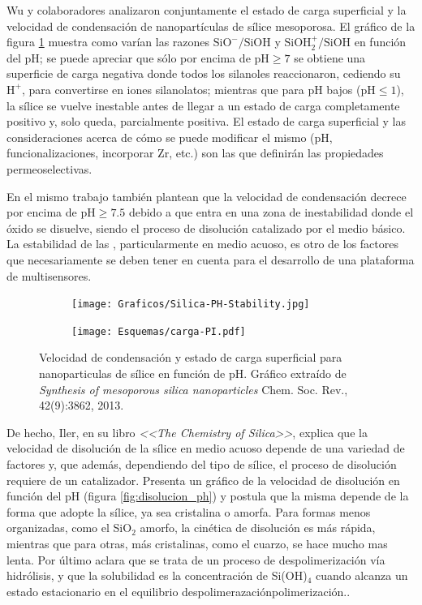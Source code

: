      Wu y colaboradores\cite{Si-HanWu2013} analizaron conjuntamente el estado de carga superficial y la velocidad de condensación de nanopartículas de sílice mesoporosa. El gráfico de la figura \ref{fig:silica_ph} muestra como varían las razones  $\text{SiO}^{-}/\text{SiOH}$ y $\text{SiOH}_2^{+}/\text{SiOH}$ en función del pH; se puede apreciar que sólo por encima de $\text{pH}\geq7$ se obtiene una superficie de carga negativa donde todos los silanoles reaccionaron, cediendo su $\text{H}^{+}$, para convertirse en iones silanolatos; mientras que para pH bajos ($\text{pH}\leq1$), la sílice se vuelve inestable antes de llegar a un estado de carga completamente positivo y, solo queda, parcialmente positiva. El estado de carga superficial y las consideraciones acerca de cómo se puede modificar el mismo (pH, funcionalizaciones, incorporar Zr, etc.) son las que definirán las propiedades permeoselectivas.  
	 
	 En el mismo trabajo\cite{Si-HanWu2013} también plantean que la velocidad de condensación decrece por encima de $\text{pH}\geq7.5$ debido a que entra en una zona de inestabilidad donde el óxido se disuelve, siendo el proceso de disolución catalizado por el medio básico. La estabilidad de las \pdm, particularmente en medio acuoso, es otro de los factores que necesariamente se deben  tener en cuenta para el desarrollo de una plataforma de multisensores. 


		\begin{figure}[h!]
			\begin{subfigure}[t]{0.73\textwidth}
 	       	\texttt{[image: Graficos/Silica-PH-Stability.jpg]}
 	       	\end{subfigure}
 	       	\begin{subfigure}[t]{0.25\textwidth}
 	       	 	\texttt{[image: Esquemas/carga-PI.pdf]}
	      	 \end{subfigure}
	    	\caption[Velocidad de condensación y estado de carga superficial]{Velocidad de condensación y estado de carga superficial para nanoparticulas de sílice en función de pH. Gráfico extraído de \textit{Synthesis of mesoporous silica nanoparticles} Chem. Soc. Rev., 42(9):3862, 2013.\cite{Si-HanWu2013}}
	       	\label{fig:silica_ph}
	    	\end{figure}
	    	
	De hecho, Iler, en su libro \textit{<<The Chemistry of Silica>>}, explica que la velocidad de disolución de la sílice en medio acuoso depende de una variedad de factores y, que además, dependiendo del tipo de sílice, el proceso de disolución requiere de un catalizador. Presenta un gráfico de la velocidad de disolución en función del pH (figura \ref{fig:disolucion_ph}) y postula que la misma depende de la forma que adopte la sílice, ya sea cristalina o amorfa. Para formas menos organizadas, como el SiO$_2$ amorfo, la cinética de disolución es más rápida, mientras que para otras, más cristalinas, como el cuarzo, se hace mucho mas lenta. Por último aclara que se trata de un proceso de despolimerización vía hidrólisis, y que la solubilidad es la concentración de Si(OH)$_4$ cuando alcanza un estado estacionario en el equilibrio despolimerazación\textbar polimerización.\cite{iler1979,blesa1994}. 

